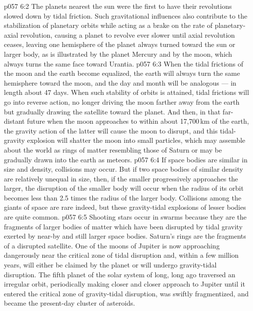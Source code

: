 \vs p057 6:2 \pc The planets nearest the sun were the first to have their revolutions slowed down by tidal friction. Such gravitational influences also contribute to the stabilization of planetary orbits while acting as a brake on the rate of planetary\hyp{}axial revolution, causing a planet to revolve ever slower until axial revolution ceases, leaving one hemisphere of the planet always turned toward the sun or larger body, as is illustrated by the planet Mercury and by the moon, which always turns the same face toward Urantia.
\vs p057 6:3 When the tidal frictions of the moon and the earth become equalized, the earth will always turn the same hemisphere toward the moon, and the day and month will be analogous --- in length about 47 days. When such stability of orbits is attained, tidal frictions will go into reverse action, no longer driving the moon farther away from the earth but gradually drawing the satellite toward the planet. And then, in that far\hyp{}distant future when the moon approaches to within about 17,700\,km of the earth, the gravity action of the latter will cause the moon to disrupt, and this tidal\hyp{}gravity explosion will shatter the moon into small particles, which may assemble about the world as rings of matter resembling those of Saturn or may be gradually drawn into the earth as meteors.
\vs p057 6:4 If space bodies are similar in size and density, collisions may occur. But if two space bodies of similar density are relatively unequal in size, then, if the smaller progressively approaches the larger, the disruption of the smaller body will occur when the radius of its orbit becomes less than 2.5 times the radius of the larger body. Collisions among the giants of space are rare indeed, but these gravity\hyp{}tidal explosions of lesser bodies are quite common.
\vs p057 6:5 Shooting stars occur in swarms because they are the fragments of larger bodies of matter which have been disrupted by tidal gravity exerted by near\hyp{}by and still larger space bodies. Saturn’s rings are the fragments of a disrupted satellite. One of the moons of Jupiter is now approaching dangerously near the critical zone of tidal disruption and, within a few million years, will either be claimed by the planet or will undergo gravity\hyp{}tidal disruption. The fifth planet of the solar system of long, long ago traversed an irregular orbit, periodically making closer and closer approach to Jupiter until it entered the critical zone of gravity\hyp{}tidal disruption, was swiftly fragmentized, and became the present\hyp{}day cluster of asteroids.
